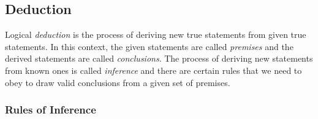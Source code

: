



\subsection{Deduction}
Logical \emph{deduction} is the process of deriving new true statements from given true statements. In this context, the given statements are called \emph{premises} and the derived statements are called \emph{conclusions}. The process of deriving new statements from known ones is called \emph{inference} and there are certain rules that we need to obey to draw valid conclusions from a given set of premises.





\subsubsection{Rules of Inference}

